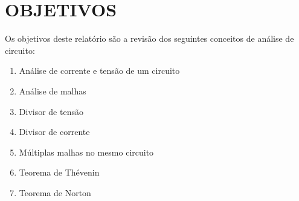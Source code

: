 \chapter{OBJETIVOS}

Os objetivos deste relatório são a revisão dos seguintes conceitos de análise de circuito:

\begin{enumerate}
    \item Análise de corrente e tensão de um circuito
    \item Análise de malhas
    \item Divisor de tensão
    \item Divisor de corrente
    \item Múltiplas malhas no mesmo circuito
    \item Teorema de Thévenin
    \item Teorema de Norton
\end{enumerate}
